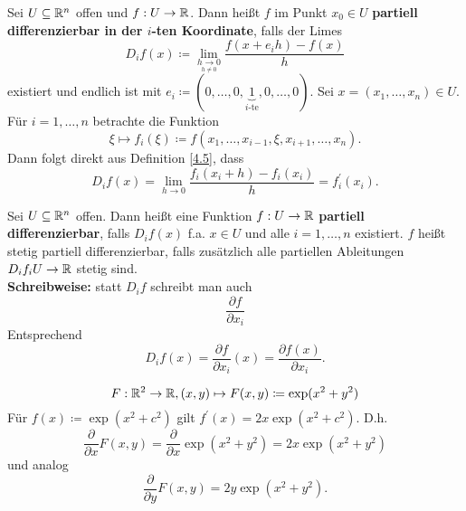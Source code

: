 \begin{definition}
	Sei $ U \subseteq \mathbb{R} ^n $ offen und $ f: U \to  \mathbb{R}  $.
	Dann heißt $ f $ im Punkt $ x_0 \in U $ \textbf{partiell differenzierbar in der $ i $-ten Koordinate}, falls der Limes
	\[
		D_i f(x) \coloneqq \lim_{\underset{h \neq  0}{h \to  0}} \frac{ f(x + e_i h) - f(x) }{ h } 
	\]
	existiert und endlich ist mit $ e_i \coloneqq (0, \dotsc, 0, \underbrace{1}_{i\text{-te} }, 0 , \dotsc, 0) $.
	Sei $ x = (x_1, \dotsc, x_n) \in U $.
	Für $ i = 1, \dotsc, n $ betrachte die Funktion
	\[
		\xi \mapsto f_i(\xi) \coloneqq f( x_1, \dotsc, x_{i - 1} , \xi, x_{i + 1} , \dotsc, x_n).
	\]
	Dann folgt direkt aus Definition \ref{4.5}, dass
	\[
		D_i f(x) = \lim_{h \to 0} \frac{ f_i(x_i + h) - f_i(x_i) }{ h } = f_i^\prime (x_i). 
	\]
	
\end{definition}

\begin{definition}
	Sei $ U \subseteq \mathbb{R} ^n $ offen.
	Dann heißt eine Funktion $ f : U \to \mathbb{R}  $ \textbf{partiell differenzierbar}, falls $ D_i f(x) $ f.a. $ x \in U $ und alle $ i = 1, \dotsc, n $ existiert.
	$ f $ heißt stetig partiell differenzierbar, falls zusätzlich alle partiellen Ableitungen $ D_i f_i U \to \mathbb{R}  $ stetig sind.\\
	\textbf{Schreibweise:} statt $ D_i f $ schreibt man auch
	\[
		\frac{\partial f}{ \partial x_i } 
	\]
	Entsprechend
	\[
		D_i f(x) = \frac{ \partial f }{ \partial x_i } (x) = \frac{ \partial f(x) }{ \partial x_i } .
	\]
\end{definition}

\begin{example}
	\[
		F : \mathbb{R} ^2 \to \mathbb{R} , (x, y) \mapsto F(x, y) \coloneqq \exp (x^2 + y^2)
	\]
	Für $ f(x) \coloneqq \exp (x^2 + c^2) $ gilt $ f^\prime (x) = 2x \exp (x^2 + c^2) $. D.h.
	\[
		\frac{\partial}{ \partial x } F(x, y) = \frac{ \partial }{ \partial x } \exp (x^2 + y^2) = 2x \exp (x^2 + y^2)
	\]
	und analog
	\[
		\frac{ \partial }{ \partial y } F(x, y) = 2y \exp (x^2 + y^2).
	\]
\end{example}

